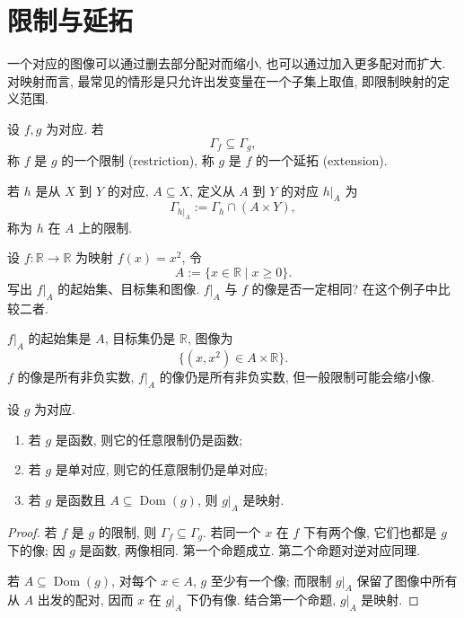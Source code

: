 \documentclass[usesamecnt, thmcnt=section, lang=cn, newtx, 10pt, scheme=chinese]{elegantbook}
\begin{document}
\section{限制与延拓}

一个对应的图像可以通过删去部分配对而缩小, 也可以通过加入更多配对而扩大. 对映射而言, 最常见的情形是只允许出发变量在一个子集上取值, 即限制映射的定义范围.

\begin{definition}[限制与延拓]\label{def:corr-restriction-extension}
设 $f,g$ 为对应. 若
\[
 \Gamma_f\subseteq\Gamma_g,
\]
称 $f$ 是 $g$ 的一个{\color{blue}限制 (restriction)}, 称 $g$ 是 $f$ 的一个{\color{blue}延拓 (extension)}.

若 $h$ 是从 $X$ 到 $Y$ 的对应, $A\subseteq X$, 定义从 $A$ 到 $Y$ 的对应 $h|_A$ 为
\[
 \Gamma_{h|_A}:=\Gamma_h\cap(A\times Y),
\]
称为 $h$ 在 $A$ 上的{\color{blue}限制}.
\end{definition}

\begin{concept}\label{con:corr-12}
设 $f:\mathbb R\to\mathbb R$ 为映射 $f(x)=x^2$, 令
\[
 A:=\{x\in\mathbb R\mid x\geq0\}.
\]
写出 $f|_A$ 的起始集、目标集和图像. $f|_A$ 与 $f$ 的像是否一定相同? 在这个例子中比较二者.
\end{concept}

\begin{solution}
$f|_A$ 的起始集是 $A$, 目标集仍是 $\mathbb R$, 图像为
\[
 \{(x,x^2)\in A\times\mathbb R\}.
\]
$f$ 的像是所有非负实数, $f|_A$ 的像仍是所有非负实数, 但一般限制可能会缩小像.
\end{solution}

\begin{proposition}\label{prop:corr-restriction-properties}
设 $g$ 为对应.
\begin{enumerate}[label=\rm(\arabic*)]
  \item 若 $g$ 是函数, 则它的任意限制仍是函数;
  \item 若 $g$ 是单对应, 则它的任意限制仍是单对应;
  \item 若 $g$ 是函数且 $A\subseteq\operatorname{Dom}(g)$, 则 $g|_A$ 是映射.
\end{enumerate}
\end{proposition}

\begin{proof}
若 $f$ 是 $g$ 的限制, 则 $\Gamma_f\subseteq\Gamma_g$. 若同一个 $x$ 在 $f$ 下有两个像, 它们也都是 $g$ 下的像; 因 $g$ 是函数, 两像相同. 第一个命题成立. 第二个命题对逆对应同理.

若 $A\subseteq\operatorname{Dom}(g)$, 对每个 $x\in A$, $g$ 至少有一个像; 而限制 $g|_A$ 保留了图像中所有从 $A$ 出发的配对, 因而 $x$ 在 $g|_A$ 下仍有像. 结合第一个命题, $g|_A$ 是映射.
\end{proof}
\end{document}

